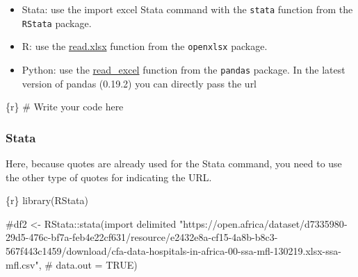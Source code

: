 \documentclass[
  letterpaper,
  DIV=11,
  numbers=noendperiod,
  oneside]{scrreprt}
\newenvironment{Shaded}{\begin{snugshade}}{\end{snugshade}}
\newcommand{\CommentTok}[1]{\textcolor[rgb]{0.37,0.37,0.37}{#1}}
\newcommand{\FunctionTok}[1]{\textcolor[rgb]{0.28,0.35,0.67}{#1}}
\newcommand{\InformationTok}[1]{\textcolor[rgb]{0.37,0.37,0.37}{#1}}
\newcommand{\NormalTok}[1]{\textcolor[rgb]{0.00,0.23,0.31}{#1}}
\providecommand{\tightlist}{%
  \setlength{\itemsep}{0pt}\setlength{\parskip}{0pt}}\usepackage{longtable,booktabs,array}
\begin{document}
\begin{tcolorbox}[enhanced jigsaw, coltitle=black, opacityback=0, title=\textcolor{quarto-callout-tip-color}{\faLightbulb}\hspace{0.5em}{Tip}, toprule=.15mm, bottomtitle=1mm, colbacktitle=quarto-callout-tip-color!10!white, colframe=quarto-callout-tip-color-frame, left=2mm, opacitybacktitle=0.6, bottomrule=.15mm, arc=.35mm, toptitle=1mm, colback=white, titlerule=0mm, breakable, leftrule=.75mm, rightrule=.15mm]

\begin{itemize}
\tightlist
\item
  Stata: use the import excel Stata command with the \texttt{stata}
  function from the \texttt{RStata} package.
\item
  R: use the
  \href{https://www.rdocumentation.org/packages/openxlsx/versions/4.2.5/topics/read.xlsx}{read.xlsx}
  function from the \texttt{openxlsx} package.
\item
  Python: use the
  \href{https://pandas.pydata.org/docs/reference/api/pandas.read_excel.html}{read\_excel}
  function from the \texttt{pandas} package. In the latest version of
  pandas (0.19.2) you can directly pass the url
\end{itemize}

\end{tcolorbox}

\begin{Shaded}
\begin{Highlighting}[]
\InformationTok{\textasciigrave{}\textasciigrave{}\textasciigrave{}\{r\}}
\CommentTok{\# Write your code here}
\InformationTok{\textasciigrave{}\textasciigrave{}\textasciigrave{}}
\end{Highlighting}
\end{Shaded}

\subsubsection{Stata}

Here, because quotes are already used for the Stata command, you need to
use the other type of quotes for indicating the URL.

\begin{Shaded}
\begin{Highlighting}[]
\InformationTok{\textasciigrave{}\textasciigrave{}\textasciigrave{}\{r\}}
\FunctionTok{library}\NormalTok{(RStata)}

\CommentTok{\#df2 \textless{}{-} RStata::stata(\textquotesingle{}import delimited "https://open.africa/dataset/d7335980{-}29d5{-}476c{-}bf7a{-}feb4e22cf631/resource/e2432e8a{-}cf15{-}4a8b{-}b8c3{-}567f443c1459/download/cfa{-}data{-}hospitals{-}in{-}africa{-}00{-}ssa{-}mfl{-}130219.xlsx{-}ssa{-}mfl.csv"\textquotesingle{},}
                     \CommentTok{\# data.out = TRUE)}
\InformationTok{\textasciigrave{}\textasciigrave{}\textasciigrave{}}
\end{Highlighting}
\end{Shaded}
\end{document}
